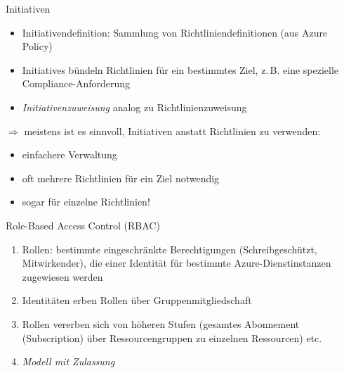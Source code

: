\begin{flashcard}[Definition]{Initiativen}
    \begin{itemize}
        \item Initiativendefinition:\newline
        Sammlung von Richtliniendefinitionen (aus Azure Policy)
        \item Initiatives bündeln Richtlinien für ein bestimmtes Ziel, z.\,B. eine spezielle Compliance-Anforderung
        \item \emph{Initiativenzuweisung} analog zu Richtlinienzuweisung
    \end{itemize}
    
    \vspace{5mm}
    $\Rightarrow$ meistens ist es sinnvoll, Initiativen anstatt Richtlinien zu verwenden:
    \begin{itemize}
        \item einfachere Verwaltung
        \item oft mehrere Richtlinien für ein Ziel notwendig
        \item sogar für einzelne Richtlinien!
    \end{itemize}

\end{flashcard}

\begin{flashcard}[Definition]{Role-Based Access Control (RBAC)}
    \begin{enumerate}
        \item Rollen: bestimmte eingeschränkte Berechtigungen (Schreibgeschützt, Mitwirkender), die einer Identität für bestimmte Azure-Dienstinstanzen zugewiesen werden
        \item Identitäten erben Rollen über Gruppenmitgliedschaft
        \item Rollen vererben sich von höheren Stufen (gesamtes Abonnement (Subscription) über Ressourcengruppen zu einzelnen Ressourcen) etc.
        \item[$\Rightarrow$] \emph{Modell mit Zulassung}
    \end{enumerate}
\end{flashcard}

